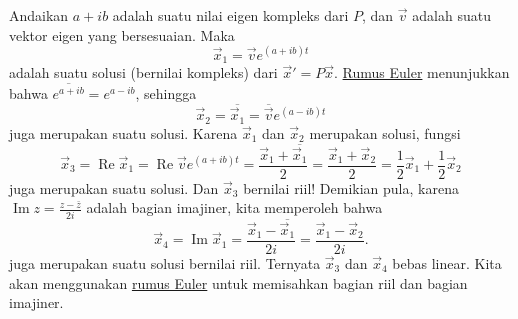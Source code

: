 Andaikan $a + ib$ adalah suatu nilai eigen kompleks dari $P$, dan $\vec{v}$
adalah suatu vektor eigen yang bersesuaian.  Maka
\begin{equation*}
\vec{x}_1 = \vec{v} e^{(a+ib)t}
\end{equation*}
adalah suatu solusi (bernilai kompleks) dari
${\vec{x}}' = P \vec{x}$.  \hyperref[eulersformula]{Rumus Euler}
menunjukkan bahwa $\overline{e^{a+ib}} =
e^{a-ib}$,
sehingga
\begin{equation*}
\vec{x}_2 = \overline{\vec{x}_1} = \overline{\vec{v}} e^{(a-ib)t}
\end{equation*}
juga merupakan suatu solusi.
Karena $\vec{x}_1$ dan $\vec{x}_2$ merupakan solusi, fungsi
\begin{equation*}
\vec{x}_3 =
\operatorname{Re} \vec{x}_1 =
\operatorname{Re} \vec{v} e^{(a+ib)t} =
\frac{\vec{x}_1 + \overline{\vec{x}_1}}{2}  =
\frac{\vec{x}_1 + \vec{x}_2}{2} 
=
\frac{1}{2} \vec{x}_1 + \frac{1}{2}\vec{x}_2
\end{equation*}
juga merupakan suatu solusi.  Dan $\vec{x}_3$ bernilai riil!  Demikian pula, karena
$\operatorname{Im} z = \frac{z-\bar{z}}{2i}$ adalah bagian imajiner, kita memperoleh
bahwa
\begin{equation*}
\vec{x}_4 =
\operatorname{Im} \vec{x}_1 =
\frac{\vec{x}_1 - \overline{\vec{x}_1}}{2i}  =
\frac{\vec{x}_1 - \vec{x}_2}{2i} .
\end{equation*}
juga merupakan suatu solusi bernilai riil.  Ternyata $\vec{x}_3$ dan
$\vec{x}_4$ bebas linear.
Kita akan menggunakan \hyperref[eulersformula]{rumus Euler}
untuk memisahkan bagian riil dan bagian imajiner.

\medskip

